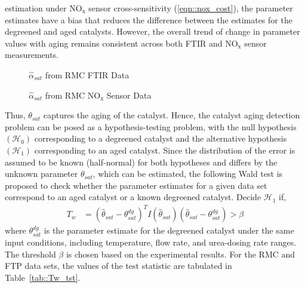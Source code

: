\documentclass[subscriptcorrection,upint,varvw,barcolor=Goldenrod3,mathalfa=cal=euler,balance,hyphenate,french,pdf-a]{asmejour}
\newcommand{\lr}[1]{\left( #1 \right)}
\newcommand{\figWidth}{0.45\textwidth}
\newcommand{\nox}{\text{NO}_{\text{x}}}
\begin{document}
estimation under $\nox$ sensor cross-sensitivity (\ref{eqn::nox_cost}), the parameter estimates have a bias that reduces
the difference between the estimates for the degreened and aged catalysts. However, the overall trend of change in
parameter values with aging remains consistent across both FTIR and $\nox$ sensor measurements.
\begin{figure}[ht]
        \centering
        \caption{$\hat \alpha_{sat}$ from RMC FTIR Data}
        \label{fig::alpha_sat_ssd}
\end{figure}
\begin{figure}[ht]
        \centering
        \caption{$\hat \alpha_{sat}$ from RMC $\nox$ Sensor Data}
        \label{fig::alpha_sat_iod}
\end{figure}
\par Thus, $\theta_{sat}$ captures the aging of the catalyst. Hence, the catalyst aging detection problem can be posed
as a hypothesis-testing problem, with the null hypothesis $\lr{\mathcal{H}_0}$ corresponding to a degreened catalyst and
the alternative hypothesis $\lr{\mathcal{H}_1}$ corresponding to an aged catalyst. Since the distribution of the error is
assumed to be known (half-normal) for both hypotheses and differs by the unknown parameter $\theta_{sat}$, which can be
estimated, the following Wald test \cite{wald1943tests} is proposed to check whether the parameter estimates for a given
data set correspond to an aged catalyst or a known degreened catalyst.
Decide $\mathcal{H}_1$ if,
\begin{align}
        T_w  &= \lr{\hat \theta_{sat} - \theta_{sat}^{dg}}^T I\lr{\hat \theta_{sat}} \lr{\hat \theta_{sat} - \theta_{sat}^{dg}} > \beta \label{eqn::wald_test}
\end{align}
where $\theta_{sat}^{dg}$ is the parameter estimate for the degreened catalyst under the same input conditions,
including temperature, flow rate, and urea-dosing rate ranges. The threshold $\beta$ is chosen based on the experimental
results. For the RMC and FTP data sets, the values of the test statistic are tabulated in Table~\ref{tab::Tw_tst}.
\end{document}
